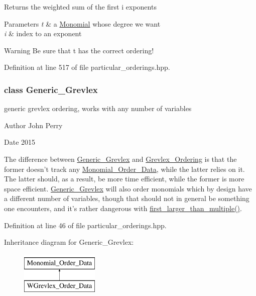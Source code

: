 \begin{DoxyReturn}{Returns}
the weighted sum of the first i exponents 
\end{DoxyReturn}

\begin{DoxyParams}{Parameters}
{\em t} & a \hyperlink{group__polygroup_class_monomial}{Monomial} whose degree we want \\
\hline
{\em i} & index to an exponent \\
\hline
\end{DoxyParams}
\begin{DoxyWarning}{Warning}
Be sure that {\ttfamily t} has the correct ordering! 
\end{DoxyWarning}


Definition at line 517 of file particular\+\_\+orderings.\+hpp.

\label{class_generic___grevlex}
\subsubsection{class Generic\+\_\+\+Grevlex}
generic grevlex ordering, works with any number of variables 

\begin{DoxyAuthor}{Author}
John Perry 
\end{DoxyAuthor}
\begin{DoxyDate}{Date}
2015
\end{DoxyDate}
The difference between \hyperlink{group__orderinggroup_class_generic___grevlex}{Generic\+\_\+\+Grevlex} and \hyperlink{group__orderinggroup_class_grevlex___ordering}{Grevlex\+\_\+\+Ordering} is that the former doesn't track any \hyperlink{group__orderinggroup_class_monomial___order___data}{Monomial\+\_\+\+Order\+\_\+\+Data}, while the latter relies on it. The latter should, as a result, be more time efficient, while the former is more space efficient. \hyperlink{group__orderinggroup_class_generic___grevlex}{Generic\+\_\+\+Grevlex} will also order monomials which by design have a different number of variables, though that should not in general be something one encounters, and it's rather dangerous with \hyperlink{group__orderinggroup_a1696724ba30a8565b759bb2c8aeefde4}{first\+\_\+larger\+\_\+than\+\_\+multiple()}. 

Definition at line 46 of file particular\+\_\+orderings.\+hpp.

Inheritance diagram for Generic\+\_\+\+Grevlex\+:\begin{figure}[H]
\begin{center}
\leavevmode
\includegraphics[height=2.000000cm]{group__orderinggroup}
\end{center}
\end{figure}
